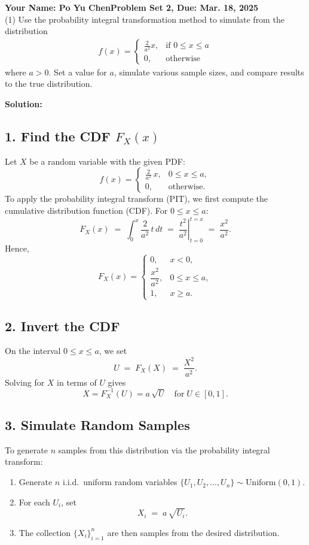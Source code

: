 \documentclass[final,11pt]{article}
\begin{document}
\thispagestyle{empty}
\begin{spacing}{1.25}

\textbf{Your Name: Po Yu Chen\hfill Problem Set 2, Due: Mar. 18, 2025}\\

(1) Use the probability integral transformation method to simulate from the distribution
\begin{gather}
    f(x) = 
    \begin{cases}
        \frac{2}{a^2}x,  & \text{if }0\leq x\leq a \\
        0, & \text{otherwise}
    \end{cases}
\end{gather}
where $a>0$. Set a value for $a$, simulate various sample sizes, and compare results to the true distribution.


{
\textbf{Solution:}

\subsection*{1. Find the CDF $F_X(x)$}
Let $X$ be a random variable with the given PDF:
\[
f(x) = 
\begin{cases}
\frac{2}{a^2} \, x, & 0 \le x \le a,\\[6pt]
0, & \text{otherwise}.
\end{cases}
\]
To apply the probability integral transform (PIT), we first compute the cumulative distribution function (CDF). For $0 \le x \le a$:
\[
F_X(x) \;=\; \int_0^x \frac{2}{a^2}\, t \, dt
\;=\; \left.\frac{t^2}{a^2}\right\vert_{t=0}^{t=x}
\;=\; \frac{x^2}{a^2}.
\]
Hence,
\[
F_X(x) = 
\begin{cases}
0, & x < 0,\\
\dfrac{x^2}{a^2}, & 0 \le x \le a,\\[6pt]
1, & x \ge a.
\end{cases}
\]

\subsection*{2. Invert the CDF}
On the interval $0 \le x \le a$, we set
\[
U \;=\; F_X(X) \;=\; \frac{X^2}{a^2}.
\]
Solving for $X$ in terms of $U$ gives
\[
X 
= F_X^{-1}(U)
= a \,\sqrt{U}
\quad \text{for}\; U \in [0,1].
\]

\subsection*{3. Simulate Random Samples}
To generate $n$ samples from this distribution via the probability integral transform:
\begin{enumerate}
   \item Generate $n$ i.i.d.\ uniform random variables $\{U_1, U_2, \ldots, U_n\} \sim \text{Uniform}(0,1)$.
   \item For each $U_i$, set
   \[
     X_i \;=\; a\, \sqrt{U_i}.
   \]
   \item The collection $\{X_i\}_{i=1}^n$ are then samples from the desired distribution.
\end{enumerate}

}
\end{spacing}
\end{document}
